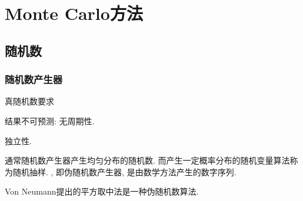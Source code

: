 \documentclass[hidelinks]{ctexart}
\begin{document}
\section{Monte Carlo方法} %
\label{sec:monte_carlo方法}

\subsection{随机数} %
\label{sub:随机数}

\subsubsection{随机数产生器} %
\label{ssub:随机数产生器}

真随机数要求
\begin{cenum}
    \item 结果不可预测: 无周期性.
    \item 独立性.
\end{cenum}

通常随机数产生器产生均匀分布的随机数. 而产生一定概率分布的随机变量算法称为随机抽样. , 即伪随机数产生器, 是由数学方法产生的数字序列.

\begin{ex}
    Von Neumann提出的平方取中法是一种伪随机数算法.
\end{ex}
\end{document}
